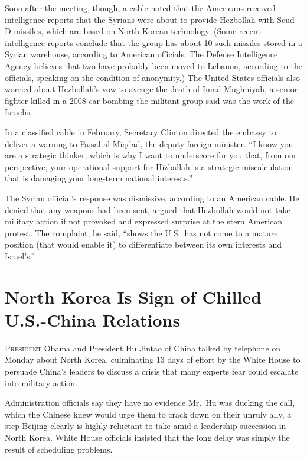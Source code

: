 ﻿\documentclass[12pt]{article}
\begin{document}
Soon after the meeting, though, a cable noted that the Americans received intelligence reports that
the Syrians were about to provide Hezbollah with Scud-D missiles, which are based on North Korean
technology. (Some recent intelligence reports conclude that the group has about 10 such missiles
stored in a Syrian warehouse, according to American officials. The Defense Intelligence Agency
believes that two have probably been moved to Lebanon, according to the officials, speaking on the
condition of anonymity.) The United States officials also worried about Hezbollah's vow to avenge
the death of Imad Mughniyah, a senior fighter killed in a 2008 car bombing the militant group said
was the work of the Israelis.

In a classified cable in February, Secretary Clinton directed the embassy to deliver a warning to
Faisal al-Miqdad, the deputy foreign minister. ``I know you are a strategic thinker, which is why I
want to underscore for you that, from our perspective, your operational support for Hizballah is a
strategic miscalculation that is damaging your long-term national interests.''

The Syrian official's response was dismissive, according to an American cable. He denied that any
weapons had been sent, argued that Hezbollah would not take military action if not provoked and
expressed surprise at the stern American protest. The complaint, he said, ``shows the U.S.~has not
come to a mature position (that would enable it) to differentiate between its own interests and
Israel's.''

\section{North Korea Is Sign of Chilled U.S.-China Relations}

\lettrine{P}{resident} Obama and President Hu Jintao of China
talked by telephone on Monday about North Korea, culminating 13 days of effort by the White House to
persuade China's leaders to discuss a crisis that many experts fear could escalate into military
action.

Administration officials say they have no evidence Mr.~Hu was ducking the call, which the Chinese
knew would urge them to crack down on their unruly ally, a step Beijing clearly is highly reluctant
to take amid a leadership succession in North Korea. White House officials insisted that the long
delay was simply the result of scheduling problems.
\end{document}
